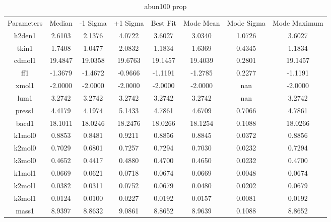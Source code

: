 \begin{table}
\caption{abun100 prop}
\begin{tabular}{cccccccc}
Parameters & Median & -1 Sigma & +1 Sigma & Best Fit & Mode Mean & Mode Sigma & Mode Maximum \\
h2den1 & 2.6103 & 2.1376 & 4.0722 & 3.6027 & 3.0340 & 1.0726 & 3.6027 \\
tkin1 & 1.7408 & 1.0477 & 2.0832 & 1.1834 & 1.6369 & 0.4345 & 1.1834 \\
cdmol1 & 19.4847 & 19.0358 & 19.6763 & 19.1457 & 19.4039 & 0.2801 & 19.1457 \\
ff1 & -1.3679 & -1.4672 & -0.9666 & -1.1191 & -1.2785 & 0.2277 & -1.1191 \\
xmol1 & -2.0000 & -2.0000 & -2.0000 & -2.0000 & -2.0000 & nan & -2.0000 \\
lum1 & 3.2742 & 3.2742 & 3.2742 & 3.2742 & 3.2742 & nan & 3.2742 \\
press1 & 4.4179 & 4.1974 & 5.1433 & 4.7861 & 4.6709 & 0.7066 & 4.7861 \\
bacd1 & 18.1011 & 18.0246 & 18.2476 & 18.0266 & 18.1254 & 0.1088 & 18.0266 \\
k1mol0 & 0.8853 & 0.8481 & 0.9211 & 0.8856 & 0.8845 & 0.0372 & 0.8856 \\
k2mol0 & 0.7029 & 0.6801 & 0.7257 & 0.7294 & 0.7030 & 0.0232 & 0.7294 \\
k3mol0 & 0.4652 & 0.4417 & 0.4880 & 0.4700 & 0.4650 & 0.0232 & 0.4700 \\
k1mol1 & 0.0669 & 0.0621 & 0.0718 & 0.0674 & 0.0669 & 0.0048 & 0.0674 \\
k2mol1 & 0.0382 & 0.0311 & 0.0752 & 0.0679 & 0.0480 & 0.0202 & 0.0679 \\
k3mol1 & 0.0124 & 0.0100 & 0.0227 & 0.0192 & 0.0157 & 0.0081 & 0.0192 \\
mass1 & 8.9397 & 8.8632 & 9.0861 & 8.8652 & 8.9639 & 0.1088 & 8.8652 \\
\end{tabular}
\end{table}
